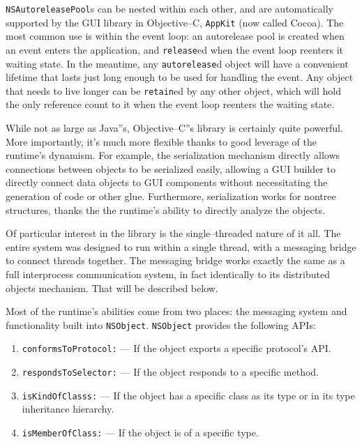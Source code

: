 \texttt{NSAutoreleasePool}s can be nested within each other, and are
automatically supported by the GUI library in Objective--C, \texttt{AppKit}
(now called Cocoa\cite{cocoa}). The most common use is within the event loop:
an autorelease pool is created when an event enters the application, and
\texttt{release}ed when the event loop reenters it waiting state. In the
meantime, any \texttt{autorelease}d object will have a convenient lifetime
that lasts just long enough to be used for handling the event. Any object that
needs to live longer can be \texttt{retain}ed by any other object, which will
hold the only reference count to it when the event loop reenters the waiting
state.

While not as large as Java''s, Objective--C''s library is certainly quite
powerful. More importantly, it's much more flexible thanks to good leverage of
the runtime's dynamism. For example, the serialization mechanism directly
allows connections between objects to be serialized easily, allowing a GUI
builder to directly connect data objects to GUI components without
necessitating the generation of code or other glue. Furthermore, serialization
works for nontree structures, thanks the the runtime's ability to directly
analyze the objects.

Of particular interest in the library is the single--threaded nature of it
all. The entire system was designed to run within a single thread, with a
messaging bridge to connect threads together. The messaging bridge works
exactly the same as a full interprocess communication system, in fact
identically to its distributed objects mechanism. That will be described
below.

Most of the runtime's abilities come from two places: the messaging system and
functionality built into \texttt{NSObject}. \texttt{NSObject} provides the
following APIs:

\begin{enumerate}

 \item \texttt{conformsToProtocol:} --- If the object exports a specific
protocol's API.

 \item \texttt{respondsToSelector:} --- If the object responds to a specific
method.

 \item \texttt{isKindOfClasss:} --- If the object has a specific class as its
type or in its type inheritance hierarchy.

 \item \texttt{isMemberOfClass:} --- If the object is of a specific type.

\end{enumerate}

